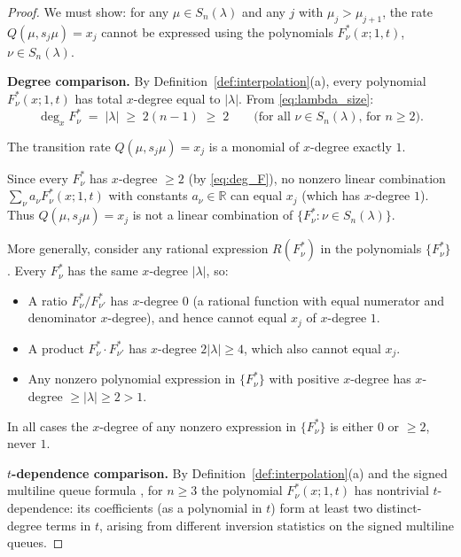 \documentclass[12pt]{article}
\theoremstyle{definition}
\begin{document}
\begin{proof}
We must show: for any $\mu \in S_n(\lambda)$ and any $j$ with
$\mu_j > \mu_{j+1}$, the rate $Q(\mu, s_j\mu) = x_j$ cannot be expressed
using the polynomials $F^*_\nu(x;1,t)$, $\nu \in S_n(\lambda)$.

\medskip
\noindent\textbf{Degree comparison.}
By Definition~\ref{def:interpolation}(a), every polynomial
$F^*_\nu(x;1,t)$ has total $x$-degree equal to $|\lambda|$.  From
\eqref{eq:lambda_size}:
\begin{equation}
  \deg_x F^*_\nu \;=\; |\lambda| \;\geq\; 2(n-1) \;\geq\; 2
  \qquad \text{(for all } \nu \in S_n(\lambda)\text{, for } n \geq 2\text{).}
\label{eq:deg_F}
\end{equation}

The transition rate $Q(\mu, s_j\mu) = x_j$ is a monomial of $x$-degree
exactly $1$.

Since every $F^*_\nu$ has $x$-degree $\geq 2$ (by \eqref{eq:deg_F}),
no nonzero linear combination $\sum_\nu a_\nu F^*_\nu(x;1,t)$ with
constants $a_\nu \in \mathbb{R}$ can equal $x_j$ (which has $x$-degree $1$).
Thus $Q(\mu, s_j\mu) = x_j$ is not a linear combination of
$\{F^*_\nu : \nu \in S_n(\lambda)\}$.

More generally, consider any rational expression $R(F^*_\nu)$ in the
polynomials $\{F^*_\nu\}$.  Every $F^*_\nu$ has the same $x$-degree
$|\lambda|$, so:
\begin{itemize}
  \item A ratio $F^*_\nu / F^*_{\nu'}$ has $x$-degree $0$ (a rational
        function with equal numerator and denominator $x$-degree), and
        hence cannot equal $x_j$ of $x$-degree $1$.
  \item A product $F^*_\nu \cdot F^*_{\nu'}$ has $x$-degree $2|\lambda|
        \geq 4$, which also cannot equal $x_j$.
  \item Any nonzero polynomial expression in $\{F^*_\nu\}$ with positive
        $x$-degree has $x$-degree $\geq |\lambda| \geq 2 > 1$.
\end{itemize}
In all cases the $x$-degree of any nonzero expression in $\{F^*_\nu\}$
is either $0$ or $\geq 2$, never $1$.

\medskip
\noindent\textbf{$t$-dependence comparison.}
By Definition~\ref{def:interpolation}(a) and the signed multiline queue
formula \cite[Thm.~1.15]{BDW25}, for $n \geq 3$ the polynomial
$F^*_\nu(x;1,t)$ has nontrivial $t$-dependence: its coefficients (as a
polynomial in $t$) form at least two distinct-degree terms in $t$,
arising from different inversion statistics on the signed multiline queues.


\end{proof}
\end{document}
